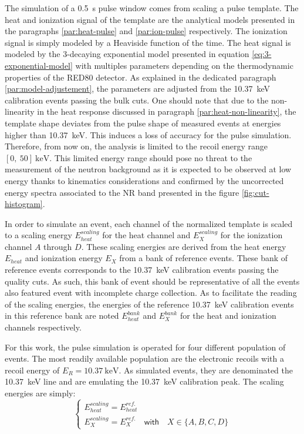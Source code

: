 
The simulation of a \SI{0.5}{\s} pulse window comes from scaling a pulse template. The heat and ionization signal of the template are the analytical models presented in the paragraphs \ref{par:heat-pulse} and \ref{par:ion-pulse} respectively. The ionization signal is simply modeled by a Heaviside function of the time. The heat signal is modeled by the 3-decaying exponential model presented in equation \ref{eq:3-exponential-model} with multiples parameters depending on the thermodynamic properties of the RED80 detector. As explained in the dedicated paragraph \ref{par:model-adjustement}, the parameters are adjusted from the \SI{10.37}{\kilo\eV} calibration events passing the bulk cuts. One should note that due to the non-linearity in the heat response discussed in paragraph \ref{par:heat-non-linearity}, the template shape deviates from the pulse shape of measured events at energies higher than \SI{10.37}{\kilo\eV}. This induces a loss of accuracy for the pulse simulation. Therefore, from now on, the analysis is limited to the recoil energy range $[0,\ 50]\ \si{\kilo\eV}$. This limited energy range should pose no threat to the measurement of the neutron background as it is expected to be observed at low energy thanks to kinematics considerations and confirmed by the uncorrected energy spectra associated to the NR band presented in the figure \ref{fig:cut-histogram}.

In order to simulate an event, each channel of the normalized template is scaled to a scaling energy $E_{heat}^{scaling}$ for the heat channel and $E_{X}^{scaling}$ for the ionization channel $A$ through $D$. 
These scaling energies are derived from the heat energy $E_{heat}$ and ionization energy $E_{X}$ from a bank of reference events. These bank of reference events corresponds to the \SI{10.37}{\kilo\eV} calibration events passing the quality cuts. As such, this bank of event should be representative of all the events also featured event with incomplete charge collection. As to facilitate the reading of the scaling energies, the energies of the reference \SI{10.37}{\kilo\eV} calibration events in this reference bank are noted $E_{heat}^{bank}$ and $E_{X}^{bank}$  for the heat and ionization channels respectively.

For this work, the pulse simulation is operated for four different population of events. The most readily available population are the electronic recoils with a recoil energy of $E_R = \SI{10.37}{\kilo\eV}$. As simulated events, they are denominated the \SI{10.37}{\kilo\eV} line and are emulating the \SI{10.37}{\kilo\eV} calibration peak. The scaling energies are simply:
\begin{equation}
\begin{cases}
\displaystyle
E_{heat}^{scaling} = E_{heat}^{ref.}
\\
\displaystyle
E_{X}^{scaling} = E_{X}^{ref.} \quad \textsf{with} \quad X \in \{A,B,C,D\}
\end{cases}
\end{equation}

